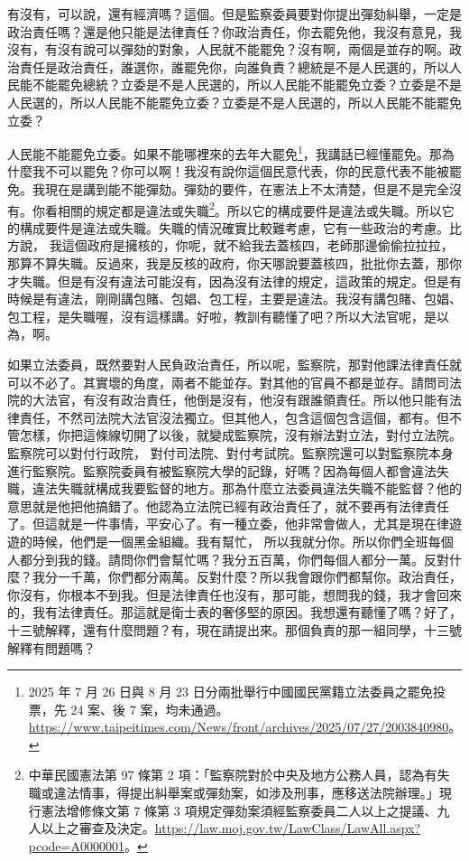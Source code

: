 \hypertarget{c08:cue:137}{}有沒有，可以說，還有經濟嗎？這個。但是監察委員要對你提出彈劾糾舉，一定是政治責任嗎？還是他只能是法律責任？你政治責任，你去罷免他，我沒有意見，我沒有，有沒有說可以彈劾的對象，人民就不能罷免？沒有啊，兩個是並存的啊。政治責任是政治責任，誰選你，誰罷免你，向誰負責？總統是不是人民選的，所以人民能不能罷免總統？立委是不是人民選的，所以人民能不能罷免立委？立委是不是人民選的，所以人民能不能罷免立委？立委是不是人民選的，所以人民能不能罷免立委？

\hypertarget{c08:cue:138}{}人民能不能罷免立委。如果不能哪裡來的去年大罷免\footnote{2025 年 7 月 26 日與 8 月 23 日分兩批舉行中國國民黨籍立法委員之罷免投票，先 24 案、後 7 案，均未通過。\url{https://www.taipeitimes.com/News/front/archives/2025/07/27/2003840980}。}，我講話已經懂罷免。那為什麼我不可以罷免？你可以啊！我沒有說你這個民意代表，你的民意代表不能被罷免。我現在是講到能不能彈劾。彈劾的要件，在憲法上不太清楚，但是不是完全沒有。你看相關的規定都是違法或失職\footnote{中華民國憲法第 97 條第 2 項：「監察院對於中央及地方公務人員，認為有失職或違法情事，得提出糾舉案或彈劾案，如涉及刑事，應移送法院辦理。」現行憲法增修條文第 7 條第 3 項規定彈劾案須經監察委員二人以上之提議、九人以上之審查及決定。\url{https://law.moj.gov.tw/LawClass/LawAll.aspx?pcode=A0000001}。}。所以它的構成要件是違法或失職。所以它的構成要件是違法或失職。失職的情況確實比較難考慮，它有一些政治的考慮。比方說，
\hypertarget{c08:cue:139}{}我這個政府是擁核的，你呢，就不給我去蓋核四，老師那邊偷偷拉拉拉，那算不算失職。反過來，我是反核的政府，你天哪說要蓋核四，批批你去蓋，那你才失職。但是有沒有違法可能沒有，因為沒有法律的規定，這政策的規定。但是有時候是有違法，剛剛講包賭、包娼、包工程，主要是違法。我沒有講包賭、包娼、包工程，是失職喔，沒有這樣講。好啦，教訓有聽懂了吧？所以大法官呢，是以為，啊。

\hypertarget{c08:cue:140}{}如果立法委員，既然要對人民負政治責任，所以呢，監察院，那對他課法律責任就可以不必了。其實壞的角度，兩者不能並存。對其他的官員不都是並存。請問司法院的大法官，有沒有政治責任，他倒是沒有，他沒有跟誰領責任。所以他只能有法律責任，不然司法院大法官沒法獨立。但其他人，包含這個包含這個，都有。但不管怎樣，你把這條線切開了以後，就變成監察院，沒有辦法對立法，對付立法院。監察院可以對付行政院，
\hypertarget{c08:cue:141}{}對付司法院、對付考試院。監察院還可以對監察院本身進行監察院。監察院委員有被監察院大學的記錄，好嗎？因為每個人都會違法失職，違法失職就構成我要監督的地方。那為什麼立法委員違法失職不能監督？他的意思就是他把他搞錯了。他認為立法院已經有政治責任了，就不要再有法律責任了。但這就是一件事情，平安心了。有一種立委，他非常會做人，尤其是現在律遊遊的時候，他們是一個黑金組織。我有幫忙，
\hypertarget{c08:cue:142}{}所以我就分你。所以你們全班每個人都分到我的錢。請問你們會幫忙嗎？我分五百萬，你們每個人都分一萬。反對什麼？我分一千萬，你們都分兩萬。反對什麼？所以我會跟你們都幫你。政治責任，你沒有，你根本不到我。但是法律責任也沒有，那可能，想問我的錢，我才會回來的，我有法律責任。那這就是衛士表的奢侈堅的原因。我想還有聽懂了嗎？好了，十三號解釋，還有什麼問題？有，現在請提出來。那個負責的那一組同學，十三號解釋有問題嗎？

